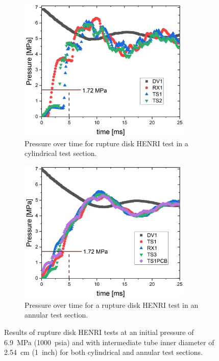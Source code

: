 \begin{figure}[tb]
    \vspace{16pt}
    \centering
    \begin{subfigure}[t]{0.45\textwidth}
        \centering
        \includegraphics[width=0.9\textwidth]{results/plots/1000psi_MPa_BD_1inch.png}
        \caption{Pressure over time for rupture disk HENRI test in a cylindrical test section.}
        \label{fig:cyl disk}
    \end{subfigure}
    \hfill
    \begin{subfigure}[t]{0.45\textwidth}
        \centering
        \includegraphics[width=0.9\textwidth]{results/plots/1000psi_annular_BD.png}
        \caption{Pressure over time for a rupture disk HENRI test in an annular test section.}
        \label{fig:ann disk}
    \end{subfigure}
    
    \caption{Results of rupture disk HENRI tests at an initial pressure of \SI{6.9}{\mega\pascal} (\SI{1000}{psia}) and with intermediate tube inner diameter of \SI{2.54}{\centi\meter} (\SI{1}{inch}) for both cylindrical and annular test sections.}
    \label{fig:disk}
    \vspace{16pt}
\end{figure}

